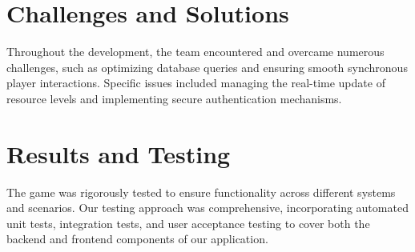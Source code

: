 \documentclass[12pt]{article}
\begin{document}
\section{Challenges and Solutions}
Throughout the development, the team encountered and overcame numerous challenges, such as optimizing database queries and ensuring smooth synchronous player interactions. Specific issues included managing the real-time update of resource levels and implementing secure authentication mechanisms.

\section{Results and Testing}
The game was rigorously tested to ensure functionality across different systems and scenarios. Our testing approach was comprehensive, incorporating automated unit tests, integration tests, and user acceptance testing to cover both the backend and frontend components of our application.
\end{document}
